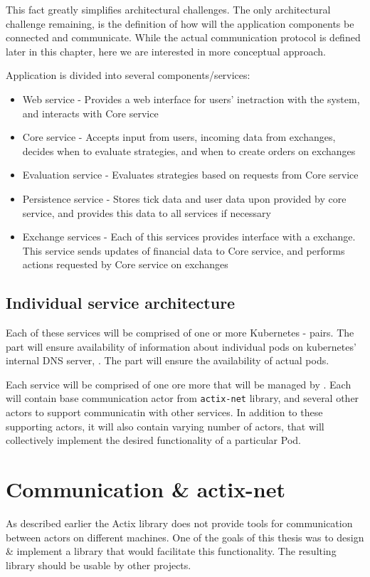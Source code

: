 This fact greatly simplifies architectural challenges. The only architectural challenge remaining, is the definition
of how will the application components be connected and communicate. While the actual communication protocol is
defined later in this chapter, here we are interested in more conceptual approach.

Application is divided into several components/services:
\begin{itemize}
    \item Web service - Provides a web interface for users' inetraction with the system, and interacts with Core service
    \item Core service - Accepts input from users, incoming data from exchanges, decides when to evaluate strategies, and when to create orders on exchanges
    \item Evaluation service - Evaluates strategies based on requests from Core service
    \item Persistence service - Stores tick data and user data upon provided by core service, and provides this data to all services if necessary
    \item Exchange services - Each of this services provides interface with a exchange. This service sends updates of financial data
    to Core service, and performs actions requested by Core service on exchanges
\end{itemize}


\subsection{Individual service architecture}
Each of these services will be comprised of one or more Kubernetes - pairs. The
 part will ensure availability of information about individual pods on kubernetes' internal DNS server, .
The  part will ensure the availability of actual pods.

Each service will be comprised of one ore more  that will be managed by . Each 
will contain base communication actor from \verb|actix-net| library, and several other actors to support communicatin with other services. In addition to
these supporting actors, it will also contain varying number of actors, that will collectively implement
the desired functionality of a particular Pod.

\section{Communication \& actix-net}
\label{section:actix_net}
As described earlier the Actix library does not provide tools for communication between actors on different machines. One of the
goals of this thesis was to design \& implement a library that would facilitate this functionality. The resulting library
should be usable by other projects.

